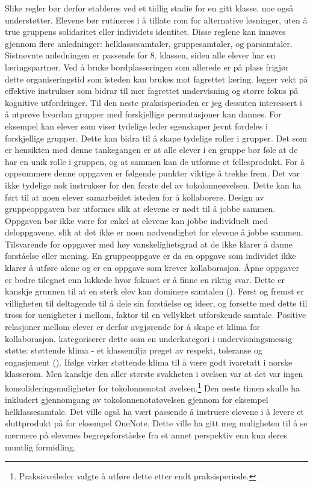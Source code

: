 \documentclass[main.tex]{subfiles}
\begin{document}
Slike regler bør derfor etableres ved et tidlig stadie for en gitt klasse, noe 
også understøtter. Elevene bør rutineres i å tillate rom for alternative løsninger, uten å true 
gruppens solidaritet eller individets identitet. Disse reglene kan innøves gjennom flere 
anledninger: helklassesamtaler, gruppesamtaler, og parsamtaler. Sistnevnte anledningen er passende
for 8. klassen, siden alle elever har en læringspartner. Ved å bruke bordplasseringen som allerede 
er på plass frigjør dette organiseringstid som isteden kan brukes mot fagrettet læring. 
 legger vekt på effektive instrukser som bidrar til mer fagrettet undervisning og 
større fokus på kognitive utfordringer.
\newline
\newline
Til den neste praksisperioden er jeg dessuten interessert i å utprøve hvordan grupper med forskjellige 
permutasjoner kan dannes.  For eksempel kan elever som viser tydelige leder egenskaper jevnt fordeles i 
forskjellige grupper. Dette kan bidra til å skape tydelige roller i grupper. Det som er hensikten med denne 
tankegangen er at alle elever i en gruppe bør føle at de har en unik rolle i gruppen, og at sammen kan 
de utforme et fellesprodukt.
\newline
\newline
For å oppsummere denne oppgaven er følgende punkter viktige å trekke frem. Det var ikke tydelige 
nok instrukser for den første del av tokolonneøvelsen. Dette kan ha ført til at noen elever 
samarbeidet isteden for å kollaborere. Design av gruppeoppgaven bør utformes slik at elevene er 
nødt til å jobbe sammen. Oppgaven bør ikke være for enkel at elevene kan jobbe individuelt med 
deloppgavene, slik at det ikke er noen nødvendighet for elevene å jobbe sammen. Tilsvarende 
for oppgaver med høy vanskelighetsgrad at de ikke klarer å danne forståelse eller mening. 
En gruppeoppgave er da en oppgave som individet ikke klarer å utføre alene og er en oppgave som 
krever kollaborasjon. Åpne oppgaver er bedre tilegnet enn lukkede hvor fokuset er å finne 
en riktig svar. Dette er kanskje grunnen til at en sterk elev kan dominere samtalen 
(). Først og fremst er villigheten til deltagende til å dele sin forståelse 
og ideer, og forsette med dette til tross for uenigheter i mellom, faktor til en vellykket 
utforskende samtale. Positive relasjoner mellom elever er derfor avgjørende for å skape et klima 
for kollaborasjon.  kategoriserer dette som en underkategori i 
undervisningsmessig støtte: støttende klima - et klassemiljø preget av respekt, toleranse og 
engasjement (). Ifølge  virker støttende klima til å være 
godt ivaretatt i norske klasserom. Men kanskje den aller største svakheten i øvelsen var at det 
var ingen konsolideringsmuligheter for tokolonnenotat øvelsen.\footnote[5]{Praksisveileder valgte 
å utføre dette etter endt praksisperiode.} Den neste timen skulle ha inkludert gjennomgang av 
tokolonnenotatøvelsen gjennom for eksempel helklassesamtale. Det ville også ha vært passende
å instruere elevene i å levere et sluttprodukt på for eksempel OneNote. Dette ville ha gitt meg
muligheten til å se nærmere på elevenes begrepsforståelse fra et annet perspektiv enn kun deres 
muntlig formidling.  
\end{document}
